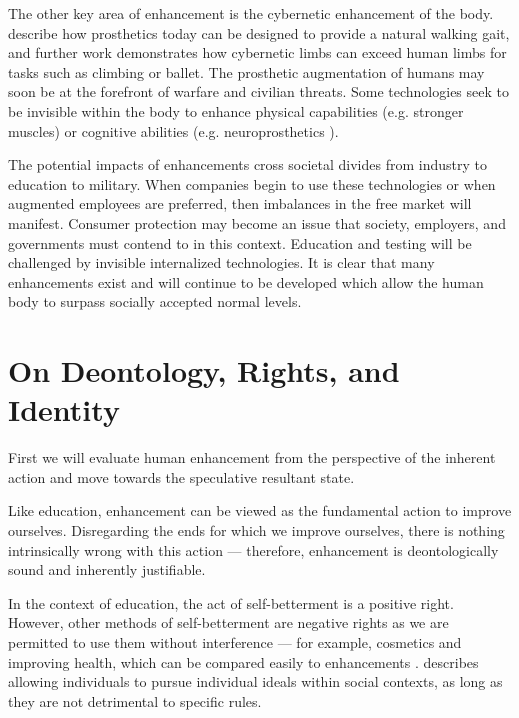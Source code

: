 \documentclass[10pt, oneside, letterpaper]{article}
\begin{document}
\begin{multicols}{2}
	The other key area of enhancement is the cybernetic enhancement of the body.  describe how prosthetics today can be designed to provide a natural walking gait, and further work demonstrates how cybernetic limbs can exceed human limbs for tasks such as climbing or ballet. The prosthetic augmentation of humans may soon be at the forefront of warfare and civilian threats. Some technologies seek to be invisible within the body to enhance physical capabilities (e.g. stronger muscles) or cognitive abilities (e.g. neuroprosthetics \cite{Moore2005}).
	
	The potential impacts of enhancements cross societal divides from industry to education to military. When companies begin to use these technologies or when augmented employees are preferred, then imbalances in the free market will manifest. Consumer protection may become an issue that society, employers, and governments must contend to in this context. Education and testing will be challenged by invisible internalized technologies. It is clear that many enhancements exist and will continue to be developed which allow the human body to surpass socially accepted normal levels.
	
	\section{On Deontology, Rights, and Identity}
	
	First we will evaluate human enhancement from the perspective of the inherent action and move towards the speculative resultant state.
	
	Like education, enhancement can be viewed as the fundamental action to improve ourselves. Disregarding the ends for which we improve ourselves, there is nothing intrinsically wrong with this action --- therefore, enhancement is deontologically sound and inherently justifiable.
	
	In the context of education, the act of self-betterment is a positive right. However, other methods of self-betterment are negative rights as we are permitted to use them without interference --- for example, cosmetics and improving health, which can be compared easily to enhancements \cite{Bostrom2008Phuman}.  describes allowing individuals to pursue individual ideals within social contexts, as long as they are not detrimental to specific rules.
	

\end{multicols}
\end{document}
